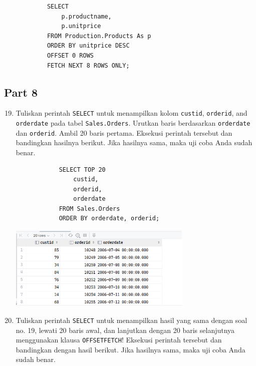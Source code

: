 \documentclass[12pt,titlepage]{article}
\begin{document}
\begin{enumerate}
{        \begin{verbatim}
            SELECT
                p.productname,
                p.unitprice
            FROM Production.Products As p
            ORDER BY unitprice DESC
            OFFSET 0 ROWS
            FETCH NEXT 8 ROWS ONLY;
        \end{verbatim}
    }
\end{enumerate}

\subsection{Part 8}
\begin{enumerate}
    \setcounter{enumi}{18}
    \item {
        Tuliskan perintah \texttt{SELECT} untuk menampilkan kolom \texttt{custid}, \texttt{orderid}, and \texttt{orderdate}
        pada tabel \texttt{Sales.Orders}. Urutkan baris berdasarkan \texttt{orderdate} dan \texttt{orderid}. Ambil 20 baris
        pertama. Eksekusi perintah tersebut dan bandingkan hasilnya berikut. Jika hasilnya sama, maka
        uji coba Anda sudah benar.

        \begin{verbatim}
            SELECT TOP 20
                custid,
                orderid,
                orderdate
            FROM Sales.Orders
            ORDER BY orderdate, orderid;
        \end{verbatim}

        \begin{center}
            \includegraphics[height=4cm]{./images/p8-n1.png}
        \end{center}
    }
    \item {
        Tuliskan perintah \texttt{SELECT} untuk menampilkan hasil yang sama dengan soal no. 19,
        lewati 20 baris awal, dan lanjutkan dengan 20 baris selanjutnya menggunakan klausa \texttt{OFFSETFETCH}! Eksekusi perintah tersebut dan bandingkan dengan hasil berikut. Jika hasilnya sama,
        maka uji coba Anda sudah benar.

}
\end{enumerate}
\end{document}
